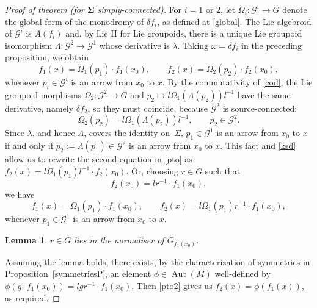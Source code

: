 \documentclass[11pt]{article}
\numberwithin{equation}{section}
\numberwithin{equation}{section}
\newtheorem{Lemma}[Theorem]{Lemma}
\DeclareMathOperator{\automorphism}{Aut}
\begin{document}
\begin{proof}[Proof of theorem (for $\boldsymbol{\Sigma}$ simply-connected)]
For $i=1$ or $2$, let $\Omega_i \colon {\mathcal G}^i \rightarrow G$
denote the global form of the monodromy of $\delta f_i$, as defined at
\eqref{global}. The Lie algebroid of ${\mathcal G}^i$ is $A(f_i)$ and,
by Lie II for Lie groupoids, there is a unique Lie groupoid
isomorphism $\Lambda \colon {\mathcal G}^2\rightarrow {\mathcal G}^1$
whose derivative is $\lambda$. Taking $\omega = \delta f_i$ in the
preceding proposition, we obtain
\begin{equation} f_1(x) = \Omega_1(p_1) \cdot f_1(x_0),\qquad f_2(x) =
\Omega_2(p_2) \cdot f_2(x_0), \label{pto}
\end{equation} whenever $p_i \in {\mathcal G}^i$ is an arrow from
$x_0$ to $x$. By the commutativity of \eqref{cod}, the Lie groupoid
morphisms $\Omega_2 \colon {\mathcal G}^2 \rightarrow G$ and $p_2
\mapsto l \Omega_1({\Lambda}(p_2))l^{-1}$ have the same
derivative, namely $\delta f_2$, so they must coincide, because
${\mathcal G}^2$ is source-connected:
\begin{equation}
\Omega_2(p_2) = l\Omega_1({\Lambda}(p_2))l^{-1},\qquad
p_2 \in {\mathcal G}^2.\label{ksd}
\end{equation}
Since $\lambda$, and hence $\Lambda$, covers the
identity on~$\Sigma $, $p_1 \in {\mathcal G}^1$ is an arrow from $x_0$
to $x$ if and only if $p_2:=\Lambda(p_1)\in {\mathcal G}^2$ is an
arrow from $x_0$ to $x$. This fact and \eqref{ksd} allow us to rewrite
the second equation in \eqref{pto} as $f_2(x)=l \Omega_1(p_1)l^{-1}
\cdot f_2(x_0)$. Or, choosing $r \in G$ such that
\begin{equation} f_2(x_0)=lr^{-1}\cdot f_1(x_0),\label{five}
\end{equation} we have
\begin{equation} f_1(x) = \Omega_1(p_1) \cdot f_1(x_0),\qquad f_2(x) =
l\Omega_1(p_1)r^{-1} \cdot f_1(x_0), \label{pto2}
\end{equation} whenever $p_1 \in {\mathcal G}^1$ is an arrow from
$x_0$ to $x$.
\begin{Lemma} $r \in G$ lies in the normaliser of $G_{f_1(x_0)}$.
\end{Lemma}

Assuming the lemma holds, there exists, by the
characterization of symmetries in Proposition~\ref{symmetriesP}, an
element $\phi \in \automorphism(M)$ well-defined by $\phi(g \cdot
f_1(x_0))=lgr^{-1}\cdot f_1(x_0)$. Then \eqref{pto2} gives us
$f_2(x)=\phi(f_1(x))$, as required.
\end{proof}
%
\end{document}
